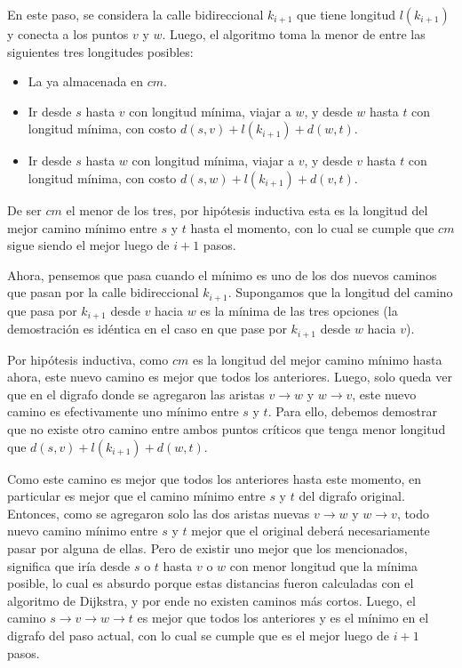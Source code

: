 \vspace{1em}

En este paso, se considera la calle bidireccional $k_{i+1}$ que tiene longitud $l(k_{i+1})$ y conecta a los puntos $v$ y $w$. Luego, el algoritmo toma la menor de entre las siguientes tres longitudes posibles:

\begin{itemize}
        \item La ya almacenada en $cm$.
        \item Ir desde $s$ hasta $v$ con longitud mínima, viajar a $w$, y desde $w$ hasta $t$ con longitud mínima, con costo $d(s,v) + l(k_{i+1}) + d(w,t)$.
        \item Ir desde $s$ hasta $w$ con longitud mínima, viajar a $v$, y desde $v$ hasta $t$ con longitud mínima, con costo $d(s,w) + l(k_{i+1}) + d(v,t)$.
\end{itemize}

De ser $cm$ el menor de los tres, por hipótesis inductiva esta es la longitud del mejor camino mínimo entre $s$ y $t$ hasta el momento, con lo cual se cumple que $cm$ sigue siendo el mejor luego de $i+1$ pasos.

\vspace{1em}

Ahora, pensemos que pasa cuando el mínimo es uno de los dos nuevos caminos que pasan por la calle bidireccional $k_{i+1}$. Supongamos que la longitud del camino que pasa por $k_{i+1}$ desde $v$ hacia $w$ es la mínima de las tres opciones (la demostración es idéntica en el caso en que pase por $k_{i+1}$ desde $w$ hacia $v$). 

\vspace{1em}

Por hipótesis inductiva, como $cm$ es la longitud del mejor camino mínimo hasta ahora, este nuevo camino es mejor que todos los anteriores. Luego, solo queda ver que en el digrafo donde se agregaron las aristas $v \rightarrow w$ y $w \rightarrow v$, este nuevo camino es efectivamente uno mínimo entre $s$ y $t$. Para ello, debemos demostrar que no existe otro camino entre ambos puntos críticos que tenga menor longitud que $d(s,v) + l(k_{i+1}) + d(w,t)$. 

\vspace{1em}

Como este camino es mejor que todos los anteriores hasta este momento, en particular es mejor que el camino mínimo entre $s$ y $t$ del digrafo original. Entonces, como se agregaron solo las dos aristas nuevas $v \rightarrow w$ y $w \rightarrow v$, todo nuevo camino mínimo entre $s$ y $t$ mejor que el original deberá necesariamente pasar por alguna de ellas. Pero de existir uno mejor que los mencionados, significa que iría desde $s$ o $t$ hasta $v$ o $w$ con menor longitud que la mínima posible, lo cual es absurdo porque estas distancias fueron calculadas con el algoritmo de Dijkstra, y por ende no existen caminos más cortos. Luego, el camino $s \rightarrow v \rightarrow w \rightarrow t$ es mejor que todos los anteriores y es el mínimo en el digrafo del paso actual, con lo cual se cumple que es el mejor luego de $i+1$ pasos.

